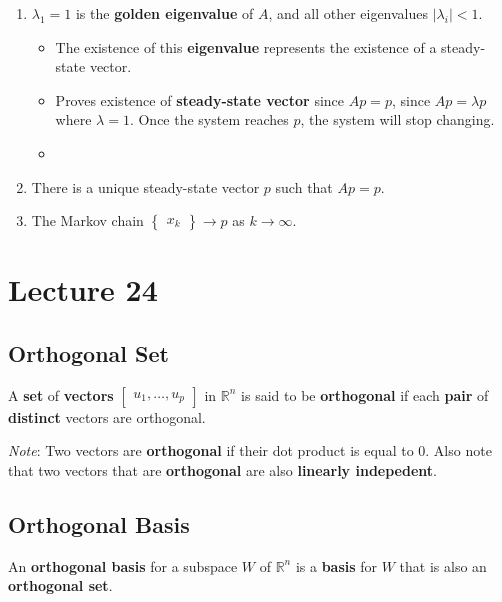 \documentclass[12pt, letterpaper]{article}
\begin{document}
  \begin{enumerate}
    \item $ \lambda_1 = 1 $ is the \textbf{golden eigenvalue} of $ A $, and
      all other eigenvalues $ | \lambda_i | < 1 $.
      \begin{itemize}
        \item The existence of this \textbf{eigenvalue} represents
          the existence of a steady-state vector.
        \item Proves existence of \textbf{steady-state vector} since
          $ Ap = p $, since $ Ap = \lambda p $ where $ \lambda = 1 $.
          Once the system reaches $ p $, the system will stop changing.
      \item
      \end{itemize}
    \item There is a unique steady-state vector $ p $ such that $ Ap = p $.
    \item The Markov chain $
      \begin{Bmatrix}
        x_k
      \end{Bmatrix} \rightarrow p $ as $ k \rightarrow \infty $.
  \end{enumerate}

  \section*{Lecture 24}

  \subsection*{Orthogonal Set}

  A \textbf{set} of \textbf{vectors} $
  \begin{bmatrix} u_1, \hdots, u_p
  \end{bmatrix} $ in $ \mathbb{R}^n $ is said to be
  \textbf{orthogonal} if each \textbf{pair} of \textbf{distinct}
  vectors are orthogonal.
  \bigskip

  \textit{Note}: Two vectors are \textbf{orthogonal} if their dot
  product is equal to $ 0 $. Also note that two vectors that are
  \textbf{orthogonal} are also \textbf{linearly indepedent}.

  \subsection*{Orthogonal Basis}

  An \textbf{orthogonal basis} for a subspace $ W $ of $ \mathbb{R}^n
  $ is a \textbf{basis} for $ W $ that is also an \textbf{orthogonal set}.
\end{document}
